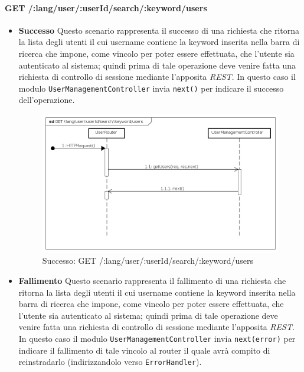 \paragraph{GET /:lang/user/:userId/search/:keyword/users}
\begin{itemize}
\item \textbf{Successo}
Questo scenario rappresenta il successo di una richiesta che ritorna la lista degli utenti il cui username contiene la keyword inserita nella barra di ricerca che impone, come vincolo per poter essere effettuata, che l'utente sia autenticato al sistema; quindi prima di tale operazione deve venire fatta una richiesta di controllo di sessione mediante l'apposita \textit{REST}. In questo caso il modulo \texttt{UserManagementController} invia \texttt{next()} per indicare il successo dell'operazione.

\begin{figure}[ht]
	\centering
	\includegraphics[scale=0.45]{UML/DiagrammiDiSequenza/Back-end/GET__lang_user__userId_search__keyword_users_success.png}
	\caption{Successo: GET /:lang/user/:userId/search/:keyword/users}
\end{figure}
\FloatBarrier

\item \textbf{Fallimento}
Questo scenario rappresenta il fallimento di una richiesta che ritorna la lista degli utenti il cui username contiene la keyword inserita nella barra di ricerca che impone, come vincolo per poter essere effettuata, che l'utente sia autenticato al sistema; quindi prima di tale operazione deve venire fatta una richiesta di controllo di sessione mediante l'apposita \textit{REST}. In questo caso il modulo \texttt{UserManagementController} invia \texttt{next(error)} per indicare il fallimento di tale vincolo al router il quale avrà compito di reinstradarlo (indirizzandolo verso \texttt{ErrorHandler}).


\end{itemize}
